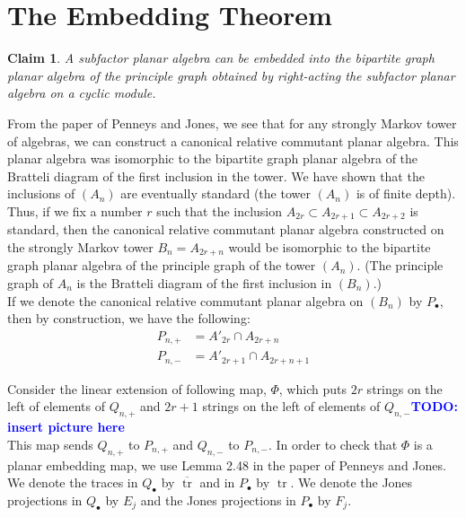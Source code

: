 \documentclass[11pt]{article}
\theoremstyle{plain}
\newtheorem*{claim*}{Claim}
\theoremstyle{definition}
\DeclareMathOperator{\tr}{tr}
\newcommand{\todo}[1]{\textcolor{blue}{\textbf{TODO: #1}}}
\begin{document}
\section{The Embedding Theorem}

\begin{claim*}
A subfactor planar algebra can be embedded into the bipartite graph planar algebra of the principle graph obtained by right-acting the subfactor planar algebra on a cyclic module.
\end{claim*}
From the paper of Penneys and Jones, %
we see that for any strongly Markov tower of algebras, we can construct a canonical relative commutant planar algebra. This planar algebra was isomorphic to the bipartite graph planar algebra of the Bratteli diagram of the first inclusion in the tower. We have shown that the inclusions of $\left(A_{n}\right)$ are eventually standard (the tower $\left(A_{n}\right)$ is of finite depth). Thus, if we fix a number $r$ such that the inclusion $A_{2r} \subset A_{2r+1} \subset A_{2r+2}$ is standard, then the canonical relative commutant planar algebra constructed on the strongly Markov tower $B_{n}=A_{2r+n}$ would be isomorphic to the bipartite graph planar algebra of the principle graph of the tower $\left(A_{n}\right)$. (The principle graph of $A_{n}$ is the Bratteli diagram of the first inclusion in $\left(B_{n}\right)$.)\\

If we denote the canonical relative commutant planar algebra on $\left(B_{n}\right)$ by $P_{\bullet}$, then by construction, we have the following:
\begin{align*}
	P_{n,+} &=  A'_{2r}\cap A_{2r+n} \\
	P_{n,-}  &= A'_{2r+1}\cap A_{2r+n+1} 
\end{align*}

Consider the linear extension of following map, $\Phi$, which puts $2r$ strings on the left of elements of $Q_{n,+}$ and $2r+1$ strings on the left of elements of $Q_{n,-}$\todo{insert picture here} \\ 

This map sends $Q_{n,+}$ to $P_{n,+}$ and $Q_{n,-}$ to $P_{n,-}$. In order to check that $\Phi$ is a planar embedding map, we use Lemma 2.48 in the paper of Penneys and Jones. %
We denote the traces in $Q_{\bullet}$ by $\overline{\tr}$ and in $P_{\bullet}$ by $\tr$. We denote the Jones projections in $Q_{\bullet}$ by $E_{j}$ and the Jones projections in  $P_{\bullet}$ by $F_{j}$.
\end{document}

